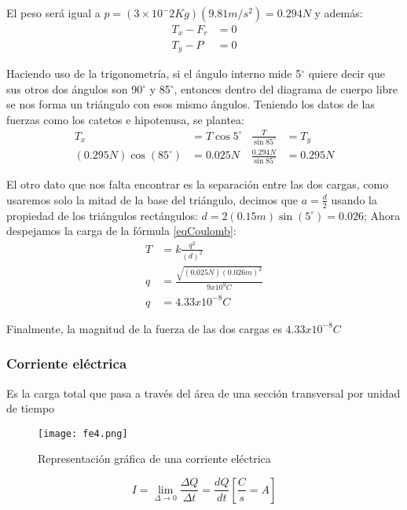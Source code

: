 El peso será igual a $p=(3 \times 10^-{2} Kg)(9.81 m/s^2)=0.294N$ y además:
\begin{align*}
	T_{x}-F_{r} & =0 \\
	T_{y}-P     & =0
\end{align*}

Haciendo uso de la trigonometría, si el ángulo interno mide 5$^{\circ}$ quiere decir que sus otros dos ángulos son 90$^{\circ}$ y 85$^{\circ}$,
entonces dentro del diagrama de cuerpo libre se nos forma un triángulo con esos mismo ángulos. Teniendo los datos de las fuerzas
como los catetos e hipotenusa, se plantea:
\begin{align*}
	T_{x}                    & = T \cos 5^{\circ} & \frac{T}{\sin 85^{\circ}}      & = T_{y}  \\
	(0.295N)\cos(85^{\circ}) & = 0.025N           & \frac{0.294N}{\sin 85^{\circ}} & = 0.295N
\end{align*}


El otro dato que nos falta encontrar es la separación entre las dos cargas, como usaremos solo la mitad de la base del triángulo, decimos que $a=\frac{d}{2}$
usando la propiedad de los triángulos rectángulos: $d=2(0.15m)\sin (5^{\circ})=0.026$; Ahora despejamos la carga de la fórmula \eqref{eqCoulomb}:
\begin{align*}
	T & = k \frac{q^2 }{(d)^2}                       \\
	q & = \frac{\sqrt{(0.025N)(0.026m)^2 }}{9x10^9C} \\
	q & = 4.33x10^{-8}C
\end{align*}

Finalmente, la magnitud de la fuerza de las dos cargas es $4.33x10^{-8}C$


\subsubsection{Corriente eléctrica}

Es la carga total que pasa a través del área de una sección transversal por unidad de tiempo

\begin{figure}[h!]
	\centerline{\texttt{[image: fe4.png]}}
	\caption{Representación gráfica de una corriente eléctrica}
	\label{fe4}
\end{figure}


\begin{equation}
	I= \lim_{\Delta  \to 0} \frac{\Delta Q}{\Delta t} = \frac{dQ}{dt}\left[\frac{C}{s} = A\right]
\end{equation}

